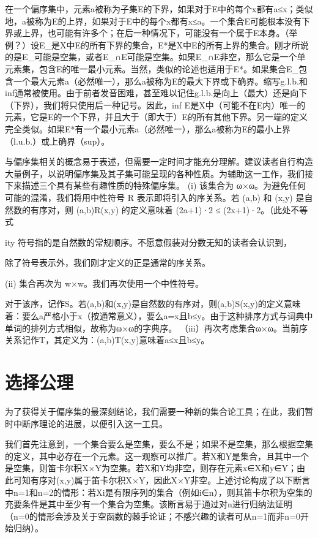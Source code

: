 \documentclass[12pt,a4paper]{ctexbook}
\theoremstyle{definition}
\theoremstyle{remark}
\begin{document}
{在一个偏序集中，元素a被称为子集E的下界，如果对于E中的每个x都有a≤x；类似地，a被称为E的上界，如果对于E中的每个x都有x≤a。一个集合E可能根本没有下界或上界，也可能有许多个；在后一种情况下，可能没有一个属于E本身。（举例？）设E\_是X中E的所有下界的集合，E*是X中E的所有上界的集合。刚才所说的是E\_可能是空集，或者E\_∩E可能是空集。如果E\_∩E非空，那么它是一个单元素集，包含E的唯一最小元素。当然，类似的论述也适用于E*。如果集合E\_包含一个最大元素a（必然唯一），那么a被称为E的最大下界或下确界。缩写g.l.b.和inf通常被使用。由于前者发音困难，甚至难以记住g.l.b.是向上（最大）还是向下（下界），我们将只使用后一种记号。因此，inf E是X中（可能不在E内）唯一的元素，它是E的一个下界，并且大于（即大于）E的所有其他下界。另一端的定义完全类似。如果E*有一个最小元素a（必然唯一），那么a被称为E的最小上界（l.u.b.）或上确界（sup）。

与偏序集相关的概念易于表述，但需要一定时间才能充分理解。建议读者自行构造大量例子，以说明偏序集及其子集可能呈现的各种性质。为辅助这一工作，我们接下来描述三个具有某些有趣性质的特殊偏序集。 (i) 该集合为 ω×ω。为避免任何可能的混淆，我们将用中性符号 R 表示即将引入的序关系。若 (a,b) 和 (x,y) 是自然数的有序对，则 (a,b)R(x,y) 的定义意味着 (2a+1)·2 ≤ (2x+1)·2。（此处不等式

ity 符号指的是自然数的常规顺序。不愿意假装对分数无知的读者会认识到，

除了符号表示外，我们刚才定义的正是通常的序关系。

(ii) 集合再次为 w×w。我们再次使用一个中性符号。

对于该序，记作S。若(a,b)和(x,y)是自然数的有序对，则(a,b)S(x,y)的定义意味着：要么a严格小于x（按通常意义），要么a=x且b≤y。由于这种排序方式与词典中单词的排列方式相似，故称为ω×ω的字典序。 （iii）再次考虑集合ω×ω。当前序关系记作T，其定义为：(a,b)T(x,y)意味着a≤x且b≤y。


\chapter{选择公理}

为了获得关于偏序集的最深刻结论，我们需要一种新的集合论工具；在此，我们暂时中断序理论的进展，以便引入这一工具。

我们首先注意到，一个集合要么是空集，要么不是；如果不是空集，那么根据空集的定义，其中必存在一个元素。这一观察可以推广。若X和Y是集合，且其中一个是空集，则笛卡尔积X×Y为空集。若X和Y均非空，则存在元素x∈X和y∈Y；由此可知有序对(x,y)属于笛卡尔积X×Y，因此X×Y非空。上述讨论构成了以下断言中n=1和n=2的情形：若{Xi}是有限序列的集合（例如i∈n），则其笛卡尔积为空集的充要条件是其中至少有一个集合为空集。该断言易于通过对n进行归纳法证明（n=0的情形会涉及关于空函数的棘手论证；不感兴趣的读者可从n=1而非n=0开始归纳）。

}
\end{document}

